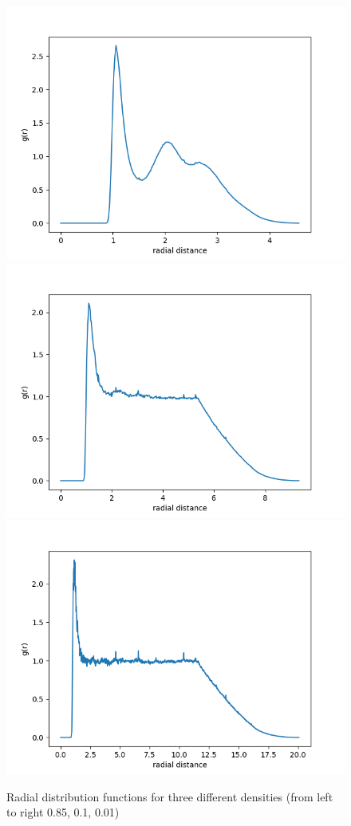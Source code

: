 \documentclass{article}
\begin{document}
		\begin{figure}[H]
				\centering
				\includegraphics[scale=0.5]{gofr_85}
				\includegraphics[scale=0.5]{gofr_10}
				\includegraphics[scale=0.5]{gofr_01}
				\caption{Radial distribution functions for three different densities (from left to right 0.85, 0.1, 0.01)}
		\end{figure}
\end{document}
